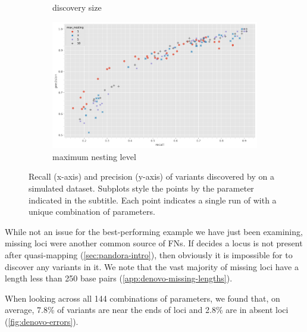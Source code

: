 \begin{figure}
\begin{subfigure}[b]{0.475\textwidth}
        \centering
        \caption{\denovo{} discovery \kmer{} size}
        \label{fig:denovo-sims-kmer-size}
     \end{subfigure}
     \begin{subfigure}[b]{0.475\textwidth}
         \centering
        \includegraphics[width=1\linewidth]{Chapter1/Figs/denovo_precrec_nesting.png}
         \caption{\prg{} maximum nesting level}
         \label{fig:denovo-sims-nesting}
     \end{subfigure}
    \caption{Recall (x-axis) and precision (y-axis) of \denovo{} variants discovered by \pandora{} on a simulated dataset. Subplots style the points by the parameter indicated in the subtitle. Each point indicates a single run of \pandora{} with a unique combination of parameters.}
        \label{fig:denovo-sims}
\end{figure}

While not an issue for the best-performing example we have just been examining, missing loci were another common source of FNs. If \pandora{} decides a locus is not present after quasi-mapping (\autoref{sec:pandora-intro}), then obviously it is impossible for \denovo{} to discover any variants in it. We note that the vast majority of missing loci have a length less than 250 base pairs (\autoref{app:denovo-missing-lengths}).

When looking across all 144 combinations of parameters, we found that, on average, 7.8\% of variants are near the ends of loci and 2.8\% are in absent loci (\autoref{fig:denovo-errors}). 

